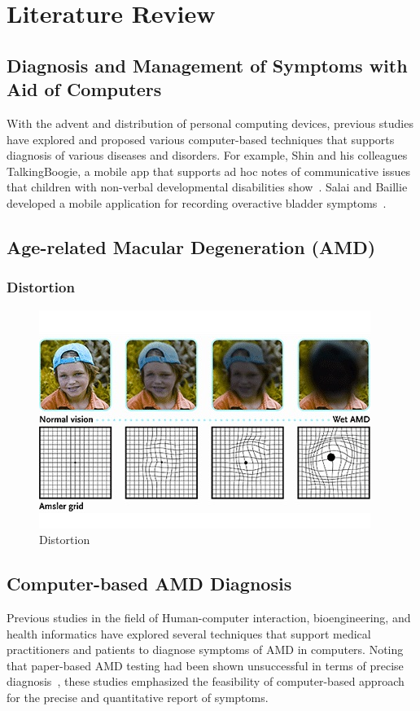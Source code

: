 \section{Literature Review}

\subsection{Diagnosis and Management of Symptoms with Aid of Computers}

With the advent and distribution of personal computing devices, previous studies have explored and proposed various computer-based techniques that supports diagnosis of various diseases and disorders. For example, Shin and his colleagues TalkingBoogie, a mobile app that supports ad hoc notes of communicative issues that children with non-verbal developmental disabilities show~\cite{shin2020talkingboogie}. Salai and Baillie developed a mobile application for recording overactive bladder symptoms~\cite{salai2019wee}.

\subsection{Age-related Macular Degeneration (AMD)}

\subsubsection{Distortion}

\begin{figure}[h!]
    \centering
    \includegraphics[width=0.6\linewidth]{figure/symptoms.jpg}
    \caption{Distortion}
    \label{fig:my_label}
\end{figure}

\subsection{Computer-based AMD Diagnosis}

Previous studies in the field of Human-computer interaction, bioengineering, and health informatics have explored several techniques that support medical practitioners and patients to diagnose symptoms of AMD in computers. Noting that paper-based AMD testing had been shown unsuccessful in terms of precise diagnosis~\cite{fine1986earliest, roy1985vision}, these studies emphasized the feasibility of computer-based approach for the precise and quantitative report of symptoms.

